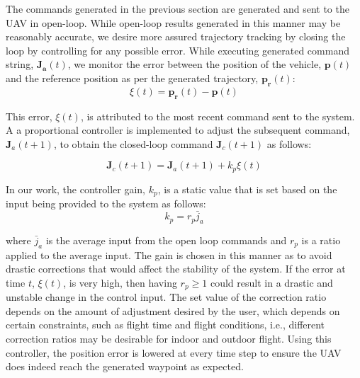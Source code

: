 \documentclass[letterpaper, 10 pt, conference]{ieeeconf}  %
\newcommand\NB[1]{$\spadesuit$\footnote{NB: #1}}
\begin{document}
The commands generated in the previous section are generated and sent to the UAV in open-loop. While open-loop results generated in this manner may be reasonably accurate, we desire more assured trajectory tracking by closing the loop by controlling for any possible error. While executing generated command string, $\bm{J_a}(t)$, we monitor the error between the position of the vehicle, $\bm{p}(t)$ and the reference position as per the generated trajectory, $\bm{p_r}(t)$:
\begin{equation}
    \xi(t) = \bm{p_r}(t)-\bm{p}(t)
\end{equation}

This error, $\xi(t)$, is attributed to the most recent command sent to the system. A a proportional controller is implemented to adjust the subsequent command, $\bm{J}_a(t+1)$, to obtain the closed-loop command $\bm{J}_c(t+1)$ as follows:

\begin{equation}
    \bm{J}_c(t+1) = \bm{J}_a(t+1) + k_p\xi(t)
\end{equation}

In our work, the controller gain, $k_p$, is a static value that is set based on the input being provided to the system as follows:
\begin{equation} \label{eq:ctrls}
    k_p = r_p\bar{j}_a
\end{equation}

where $\bar{j}_a$ is the average input from the open loop commands and $r_p$ is a ratio applied to the average input. The gain is chosen in this manner as to avoid drastic corrections that would affect the stability of the system. If the error at time $t$, $\xi(t)$, is very high, then having $r_p \geq 1$ could result in a drastic and unstable change in the control input. The set value of the correction ratio depends on the amount of adjustment desired by the user, which depends on certain constraints, such as flight time and flight conditions, i.e., different correction ratios may be desirable for indoor and outdoor flight. Using this controller, the position error is lowered at every time step to ensure the UAV does indeed reach the generated waypoint as expected.  %

\end{document}

